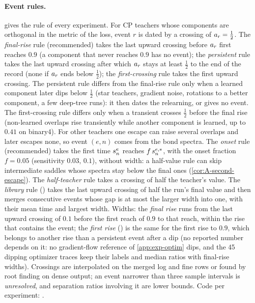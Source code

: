 \paragraph{Event rules.}
 gives the rule of every experiment. For CP teachers whose components are orthogonal
in the metric of the loss, event $r$ is dated by a crossing of $a_{r}=\frac12$. The \emph{final-rise} rule
(recommended) takes the last upward crossing before $a_{r}$ first reaches $0.9$ (a component that never reaches
$0.9$ has no event); the \emph{persistent} rule takes the last upward crossing after which $a_{r}$ stays at least
$\frac12$ to the end of the record (none if $a_{r}$ ends below $\frac12$); the \emph{first-crossing} rule takes the
first upward crossing. The persistent rule differs from the final-rise rule only when a learned component
later dips below $\frac12$ (star teachers, gradient noise, rotations to a better component, a few deep-tree
runs): it then dates the relearning, or gives no event. The first-crossing rule differs only when a transient
crosses $\frac12$ before the final rise (non-learned overlaps rise transiently while another component is
learned, up to $0.41$ on binary4). For other teachers one escape can raise several overlaps and later escapes
none, so event $(e,n)$ comes from the bond spectra. The \emph{onset} rule (recommended) takes the first time
$s^{e}_{n}$ reaches $f\,s^{e,*}_{n}$, with the onset fraction $f=0.05$ (sensitivity $0.03$, $0.1$), without width: a half-value rule can skip
intermediate saddles whose spectra stay below the final ones (\cref{cor:A-second-escape}). The
\emph{half-teacher} rule takes a crossing of half the teacher's value. The \emph{library} rule
() takes the last upward crossing of half the run's final value and then
merges consecutive events whose gap is at most the larger width into one, with their mean time and largest
width. Widths: the \emph{final rise} runs from the last upward crossing of $0.1$ before the first reach of $0.9$
to that reach, within the rise that contains the event; the \emph{first rise} ()
is the same for the first rise to $0.9$, which belongs to another rise than a persistent event after a dip (no
reported number depends on it: no gradient-flow reference of \cref{app:exp-optim} dips, and the 45 dipping
optimizer traces keep their labels and median ratios with final-rise widths). Crossings are interpolated on the merged log and fine
rows or found by root finding on dense output; an event narrower than three sample intervals is
\emph{unresolved}, and separation ratios involving it are lower bounds. Code per experiment:
.

